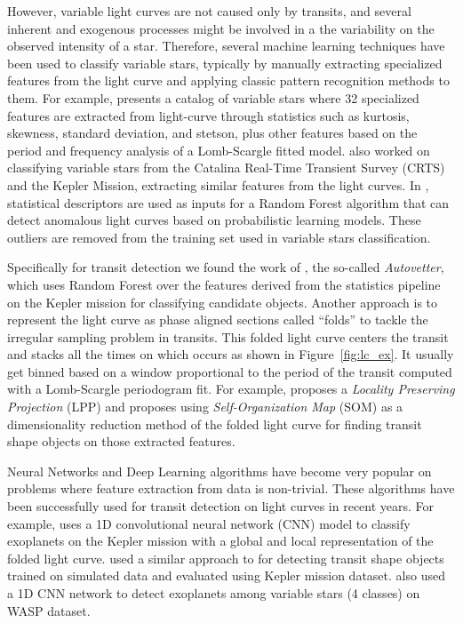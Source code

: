 However, variable light curves are not caused only by transits, and several inherent and exogenous processes might be involved in a the variability on the observed intensity of a star. Therefore, several machine learning techniques have been used to classify variable stars, typically by manually extracting specialized features from the light curve and applying classic pattern recognition methods to them. 
For example, \citep{richards2011machine} presents a catalog of variable stars where 32 specialized features are extracted from light-curve through statistics such as kurtosis, skewness, standard deviation, and stetson, plus other features based on the period and frequency analysis of a Lomb-Scargle \citep{lomb1976least} fitted model. 
\citep{donalek2013feature} also worked on classifying variable stars from the Catalina Real-Time Transient Survey (CRTS) and the Kepler Mission, extracting similar features from the light curves. 
In \citep{nun2014supervised}, statistical descriptors are used as inputs for a Random Forest algorithm that can detect anomalous light curves based on probabilistic learning models. 
These outliers are removed from the training set used in variable stars classification. 

Specifically for transit detection we found the work of \citep{mccauliff2015automatic}, the so-called \textit{Autovetter}, which uses Random Forest over the features derived from the statistics pipeline on the Kepler mission for classifying candidate objects. 
Another approach is to represent the light curve as phase aligned sections called ``folds'' to tackle the irregular sampling problem in transits. This folded light curve centers the transit and stacks all the times on which occurs as shown in Figure~\ref{fig:lc_ex}. It usually get binned based on a window proportional to the period of the transit computed with a Lomb-Scargle \citep{lomb1976least} periodogram fit. For example, \citep{thompson2015machine} proposes a \textit{Locality Preserving Projection} (LPP) and \citep{armstrong2016transit} proposes using \textit{Self-Organization Map} (SOM) as a dimensionality reduction method of the folded light curve for finding transit shape objects on those extracted features. 

Neural Networks and Deep Learning \citep{surveyDL2017} algorithms have become very popular on problems where feature extraction from data is non-trivial. These algorithms have been successfully used for transit detection on light curves in recent years. For example, \citep{shallue2018identifying} uses a 1D convolutional neural network (CNN) model \citep{krizhevsky2012imagenet} to classify exoplanets on the Kepler mission with a global and local representation of the folded light curve. 
\citep{pearson2018searching} used a similar approach to \citep{shallue2018identifying} for detecting transit shape objects trained on simulated data and evaluated using Kepler mission dataset.
\citep{schanche2019machine} also used a 1D CNN network to detect exoplanets among variable stars (4 classes) on WASP dataset. 

